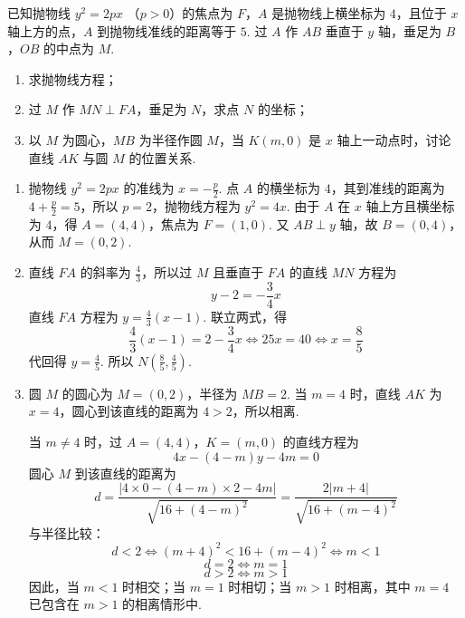 \begin{problem}
已知抛物线 \( y^{2} = 2px \) （\(p > 0\)）的焦点为 \(F\)，\(A\) 是抛物线上横坐标为 \(4\)，且位于 \(x\) 轴上方的点，\(A\) 到抛物线准线的距离等于 \(5\). 过 \(A\) 作 \(AB\) 垂直于 \(y\) 轴，垂足为 \(B\)，\(OB\) 的中点为 \(M\).

\begin{enumerate}
\item 求抛物线方程；
\item 过 \(M\) 作 \(MN \perp FA\)，垂足为 \(N\)，求点 \(N\) 的坐标；
\item 以 \(M\) 为圆心，\(MB\) 为半径作圆 \(M\)，当 \(K(m,0)\) 是 \(x\) 轴上一动点时，讨论直线 \(AK\) 与圆 \(M\) 的位置关系.
\end{enumerate}

\end{problem}

\begin{solution}
\begin{enumerate}
\item 抛物线 \(y^2=2px\) 的准线为 \(x=-\frac p2\). 点 \(A\) 的横坐标为 \(4\)，其到准线的距离为 \(4+\frac p2=5\)，所以 \(p=2\)，抛物线方程为 \(y^2=4x\). 由于 \(A\) 在 \(x\) 轴上方且横坐标为 \(4\)，得 \(A=(4,4)\)，焦点为 \(F=(1,0)\). 又 \(AB\perp y\) 轴，故 \(B=(0,4)\)，从而 \(M=(0,2)\).

\item 直线 \(FA\) 的斜率为 \(\frac43\)，所以过 \(M\) 且垂直于 \(FA\) 的直线 \(MN\) 方程为
\[
y-2=-\frac34x
\]
直线 \(FA\) 方程为 \(y=\frac43(x-1)\). 联立两式，得
\[
\frac43(x-1)=2-\frac34x\iff25x=40\iff x=\frac85
\]
代回得 \(y=\frac45\). 所以 \(N\left(\frac85,\frac45\right)\).

\item 圆 \(M\) 的圆心为 \(M=(0,2)\)，半径为 \(MB=2\). 当 \(m=4\) 时，直线 \(AK\) 为 \(x=4\)，圆心到该直线的距离为 \(4>2\)，所以相离.

当 \(m\neq4\) 时，过 \(A=(4,4)\)，\(K=(m,0)\) 的直线方程为
\[
4x-(4-m)y-4m=0
\]
圆心 \(M\) 到该直线的距离为
\[
d=\frac{|4\times0-(4-m)\times2-4m|}{\sqrt{16+(4-m)^2}}=\frac{2|m+4|}{\sqrt{16+(m-4)^2}}
\]
与半径比较：
\[
d<2\iff (m+4)^2<16+(m-4)^2\iff m<1
\]
\[
d=2\iff m=1
\]
\[
d>2\iff m>1
\]
因此，当 \(m<1\) 时相交；当 \(m=1\) 时相切；当 \(m>1\) 时相离，其中 \(m=4\) 已包含在 \(m>1\) 的相离情形中.
\end{enumerate}
\end{solution}

